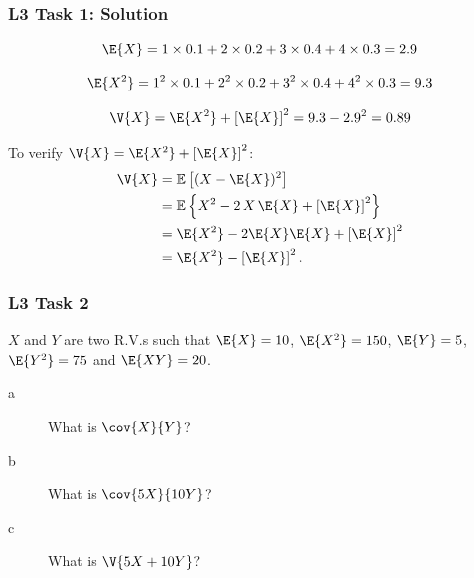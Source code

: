 \documentclass[compress]{beamer}\usepackage[]{graphicx}\usepackage[]{xcolor}
\begin{document}
\begin{frame}[fragile]
  \frametitle{L3 Task 1: Solution}
    \[ \E{X} = 1 \times 0.1 + 2 \times 0.2 + 3 \times 0.4 + 4 \times 0.3 = 2.9 \]

    \[ \E{X^2} = 1^2 \times 0.1 + 2^2 \times 0.2 + 3^2 \times 0.4 + 4^2 \times 0.3 = 9.3  \]

    \[ \V{X} = \E{X^2} + \left[ \E{X} \right]^2 = 9.3 - 2.9^2 = 0.89 \]

    To verify $\V{X} = \E{X^2} + \left[ \E{X} \right]^2$:
    \begin{equation*}
      \begin{aligned}
        \V{X} &= \mathbb{E} \left[ (X - \E{X})^2 \right] \\
        &= \mathbb{E} \left\{ X^2 - 2\, X\, \E{X} + \left[ \E{X} \right]^2 \right\} \\
        &= \E{X^2} - 2\E{X}\E{X} + \left[ \E{X} \right]^2 \\
        &= \E{X^2} - \left[ \E{X} \right]^2.
      \end{aligned}
  \end{equation*}
\end{frame}

\begin{frame}[fragile]
  \frametitle{L3 Task 2}
    $X$ and $Y$ are two R.V.s such that $\E{X} = 10$, $\E{X^2} = 150$, $\E{Y} = 5$, $\E{Y^2} = 75$ and $\E{XY} = 20$.
      \begin{description}
        \item[a] What is $\cov{X}{Y}$?
        \item[b] What is $\cov{5X}{10Y}$?
        \item[c] What is $\V{5X + 10Y}$?
      \end{description}
\end{frame}
\end{document}
